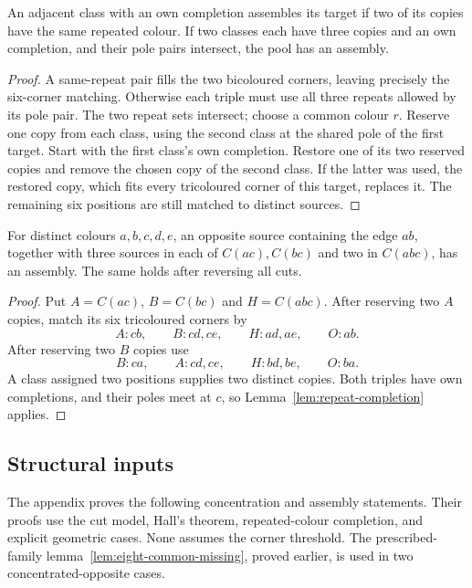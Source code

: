 \begin{lemma}\label{lem:repeat-completion}
An adjacent class with an own completion assembles its target if two of
its copies have the same repeated colour. If two classes each have three
copies and an own completion, and their pole pairs intersect, the pool
has an assembly.
\end{lemma}
\begin{proof}
A same-repeat pair fills the two bicoloured corners, leaving precisely the
six-corner matching. Otherwise each triple must use all three repeats
allowed by its pole pair. The two repeat sets intersect; choose a common
colour $r$. Reserve one copy from each class, using the second class at
the shared pole of the first target. Start with the first class's own
completion. Restore one of its two reserved copies and remove the chosen
copy of the second class. If the latter was used, the restored copy,
which fits every tricoloured corner of this target, replaces it. The
remaining six positions are still matched to distinct sources.
\end{proof}

\begin{lemma}\label{lem:nine-core}
For distinct colours $a,b,c,d,e$, an opposite source containing the edge
$ab$, together with three sources in each of $C(ac),C(bc)$ and two in
$C(abc)$, has an assembly. The same holds after reversing all cuts.
\end{lemma}
\begin{proof}
Put $A=C(ac)$, $B=C(bc)$ and $H=C(abc)$. After reserving two $A$ copies,
match its six tricoloured corners by
\[
 A:cb,\qquad B:cd,ce,\qquad H:ad,ae,\qquad O:ab.
\]
After reserving two $B$ copies use
\[
 B:ca,\qquad A:cd,ce,\qquad H:bd,be,\qquad O:ba.
\]
A class assigned two positions supplies two distinct copies. Both triples
have own completions, and their poles meet at $c$, so
Lemma~\ref{lem:repeat-completion} applies.
\end{proof}

\subsection{Structural inputs}
The appendix proves the following concentration and assembly statements.
Their proofs use the cut model, Hall's theorem, repeated-colour completion,
and explicit geometric cases. None assumes the corner threshold.
The prescribed-family lemma~\ref{lem:eight-common-missing}, proved earlier,
is used in two concentrated-opposite cases.

